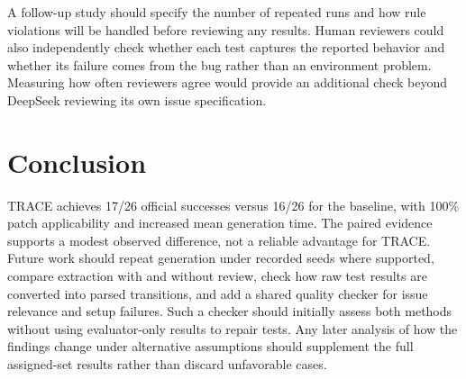A follow-up study should specify the number of repeated runs and how rule violations will be handled before reviewing any results. Human reviewers could also independently check whether each test captures the reported behavior and whether its failure comes from the bug rather than an environment problem. Measuring how often reviewers agree would provide an additional check beyond DeepSeek reviewing its own issue specification.

\section{Conclusion}
TRACE achieves 17/26 official successes versus 16/26 for the baseline, with 100\% patch applicability and increased mean generation time. The paired evidence supports a modest observed difference, not a reliable advantage for TRACE. Future work should repeat generation under recorded seeds where supported, compare extraction with and without review, check how raw test results are converted into parsed transitions, and add a shared quality checker for issue relevance and setup failures. Such a checker should initially assess both methods without using evaluator-only results to repair tests. Any later analysis of how the findings change under alternative assumptions should supplement the full assigned-set results rather than discard unfavorable cases.
